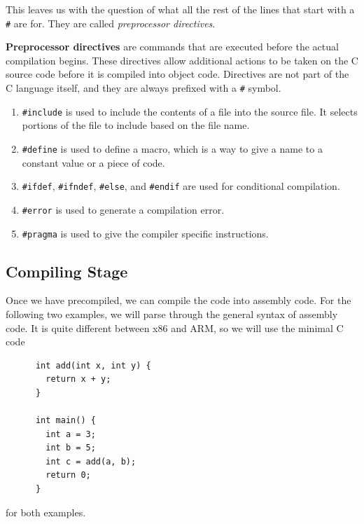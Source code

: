 \documentclass{article}
\begin{document}
    This leaves us with the question of what all the rest of the lines that start with a \texttt{\#} are for. They are called \textit{preprocessor directives}.

    \begin{definition}
      \textbf{Preprocessor directives} are commands that are executed before the actual compilation begins. These directives allow additional actions to be taken on the C source code before it is compiled into object code. Directives are not part of the C language itself, and they are always prefixed with a \texttt{\#} symbol. 
      \begin{enumerate}
        \item \texttt{\#include} is used to include the contents of a file into the source file. It selects portions of the file to include based on the file name.
        \item \texttt{\#define} is used to define a macro, which is a way to give a name to a constant value or a piece of code. 
        \item \texttt{\#ifdef}, \texttt{\#ifndef}, \texttt{\#else}, and \texttt{\#endif} are used for conditional compilation. 
        \item \texttt{\#error} is used to generate a compilation error. 
        \item \texttt{\#pragma} is used to give the compiler specific instructions. 
      \end{enumerate}
    \end{definition}

  \subsection{Compiling Stage} 

    Once we have precompiled, we can compile the code into assembly code. For the following two examples, we will parse through the general syntax of assembly code. It is quite different between x86 and ARM, so we will use the minimal C code 
    \begin{lstlisting}
      int add(int x, int y) {
        return x + y;
      }

      int main() {
        int a = 3;
        int b = 5; 
        int c = add(a, b);
        return 0; 
      }
    \end{lstlisting}
    for both examples. 
\end{document}
